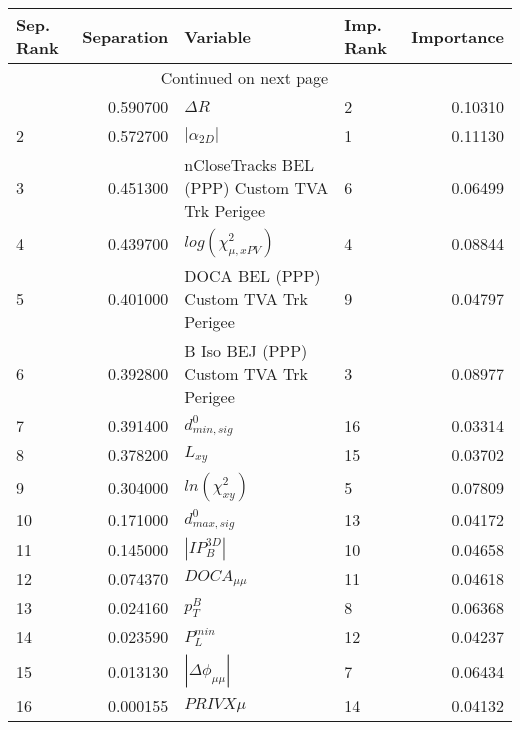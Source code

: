 \usepackage{lscape}

\begin{landscape}
\begin{longtable}{lrllr}
\toprule
Sep. Rank &  Separation &                                       Variable & Imp. Rank &  Importance \\
\midrule
\endhead
\midrule
\multicolumn{3}{r}{{Continued on next page}} \\
\midrule
\endfoot

\bottomrule
\endlastfoot
        1 &    0.590700 &                                     $\Delta R$ &         2 &     0.10310 \\
        2 &    0.572700 &                                $|\alpha_{2D}|$ &         1 &     0.11130 \\
        3 &    0.451300 &  nCloseTracks BEL (PPP) Custom TVA Trk Perigee &         6 &     0.06499 \\
        4 &    0.439700 &                      $log(\chi^{2}_{\mu,xPV})$ &         4 &     0.08844 \\
        5 &    0.401000 &          DOCA BEL (PPP) Custom TVA Trk Perigee &         9 &     0.04797 \\
        6 &    0.392800 &         B Iso BEJ (PPP) Custom TVA Trk Perigee &         3 &     0.08977 \\
        7 &    0.391400 &                               $d^0_{min, sig}$ &        16 &     0.03314 \\
        8 &    0.378200 &                                       $L_{xy}$ &        15 &     0.03702 \\
        9 &    0.304000 &                            $ln(\chi^{2}_{xy})$ &         5 &     0.07809 \\
       10 &    0.171000 &                               $d^0_{max, sig}$ &        13 &     0.04172 \\
       11 &    0.145000 &                                $|IP_{B}^{3D}|$ &        10 &     0.04658 \\
       12 &    0.074370 &                                $DOCA_{\mu\mu}$ &        11 &     0.04618 \\
       13 &    0.024160 &                                      $p^B_{T}$ &         8 &     0.06368 \\
       14 &    0.023590 &                                  $P^{min}_{L}$ &        12 &     0.04237 \\
       15 &    0.013130 &                       $|\Delta \phi_{\mu\mu}|$ &         7 &     0.06434 \\
       16 &    0.000155 &                                     $PRIVX\mu$ &        14 &     0.04132 \\
\end{longtable}

\end{landscape}

